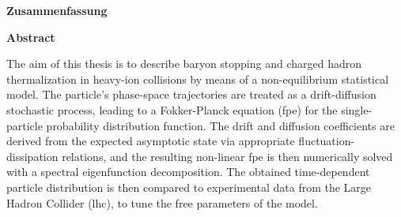 \thispagestyle{plain}

\begin{center}
    \vspace{0.9cm}
    \textbf{Zusammenfassung}
\end{center}
\blindtext

\begin{center}
    \vspace{0.9cm}
    \textbf{Abstract}
\end{center}


The aim of this thesis is to describe baryon stopping and charged hadron thermalization in heavy-ion collisions by means of a non-equilibrium statistical model. The particle's phase-space trajectories are treated as a drift-diffusion stochastic process, leading to a Fokker-Planck equation (\acrshort{fpe}) for the single-particle probability distribution function.
The drift and diffusion coefficients are derived from the expected asymptotic state via appropriate fluctuation-dissipation relations, and the resulting non-linear \acrshort{fpe} is then numerically solved with a spectral eigenfunction decomposition. The obtained time-dependent particle distribution is then compared to experimental data from the Large Hadron Collider (\acrshort{lhc}), to tune the free parameters of the model. 